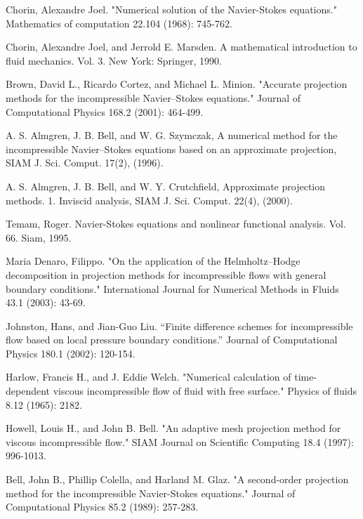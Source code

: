 
\begin{thebibliography}{88} %

  Chorin, Alexandre Joel. "Numerical solution of the Navier-Stokes equations." Mathematics of computation 22.104 (1968): 745-762.

  Chorin, Alexandre Joel, and Jerrold E. Marsden. A mathematical introduction to fluid mechanics. Vol. 3. New York: Springer, 1990.

  Brown, David L., Ricardo Cortez, and Michael L. Minion. "Accurate projection methods for the incompressible Navier–Stokes equations." Journal of Computational Physics 168.2 (2001): 464-499.

  A. S. Almgren, J. B. Bell, and W. G. Szymczak, A numerical method for the incompressible Navier–Stokes equations based on an approximate projection, SIAM J. Sci. Comput. 17(2), (1996).

  A. S. Almgren, J. B. Bell, and W. Y. Crutchfield, Approximate projection methods. 1. Inviscid analysis, SIAM J. Sci. Comput. 22(4), (2000).

  Temam, Roger. Navier-Stokes equations and nonlinear functional analysis. Vol. 66. Siam, 1995.
 
  Maria Denaro, Filippo. "On the application of the Helmholtz–Hodge decomposition in projection methods for incompressible flows with general boundary conditions." International Journal for Numerical Methods in Fluids 43.1 (2003): 43-69.

  Johnston, Hans, and Jian-Guo Liu. ``Finite difference schemes for incompressible flow based on local pressure boundary conditions.'' Journal of Computational Physics 180.1 (2002): 120-154.


 
  Harlow, Francis H., and J. Eddie Welch. "Numerical calculation of time-dependent viscous incompressible flow of fluid with free surface." Physics of fluids 8.12 (1965): 2182.

  Howell, Louis H., and John B. Bell. "An adaptive mesh projection method for viscous incompressible flow." SIAM Journal on Scientific Computing 18.4 (1997): 996-1013.

  Bell, John B., Phillip Colella, and Harland M. Glaz. "A second-order projection method for the incompressible Navier-Stokes equations." Journal of Computational Physics 85.2 (1989): 257-283.


\end{thebibliography}
